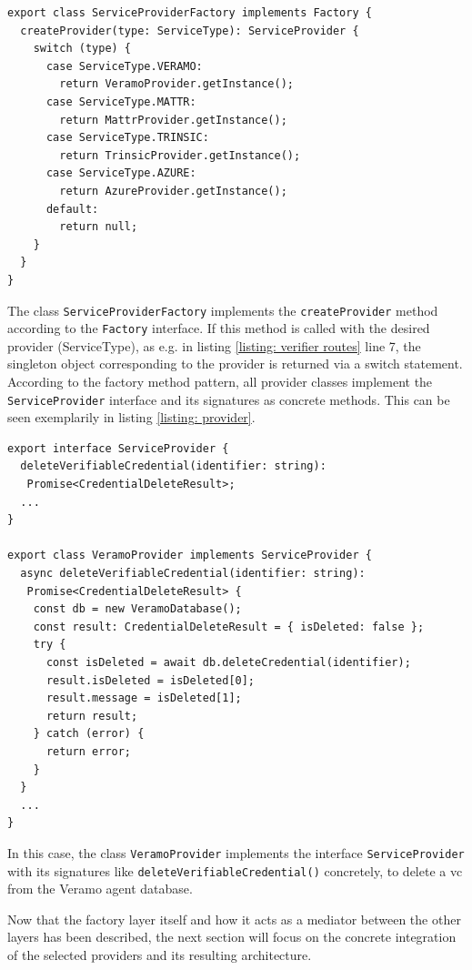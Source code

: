     \begin{lstlisting}[style=ES6, caption=Extract of service provider factory, label={listing: factory}]
export class ServiceProviderFactory implements Factory {
  createProvider(type: ServiceType): ServiceProvider {
    switch (type) {
      case ServiceType.VERAMO:
        return VeramoProvider.getInstance();
      case ServiceType.MATTR:
        return MattrProvider.getInstance();
      case ServiceType.TRINSIC:
        return TrinsicProvider.getInstance();
      case ServiceType.AZURE:
        return AzureProvider.getInstance();
      default:
        return null;
    }
  }
}
\end{lstlisting}

    The class \texttt{ServiceProviderFactory} implements the \texttt{createProvider} method according to the \texttt{Factory} interface. If this method is called with the desired provider (ServiceType), as e.g. in listing \ref{listing: verifier routes} line 7, the singleton object corresponding to the provider is returned via a switch statement. According to the factory method pattern, all provider classes implement the \texttt{ServiceProvider} interface and its signatures as concrete methods. This can be seen exemplarily in listing \ref{listing: provider}.
    \newline

\begin{lstlisting}[style=ES6, caption=Example of provider implementation, label={listing: provider}]
export interface ServiceProvider {
  deleteVerifiableCredential(identifier: string): 
   Promise<CredentialDeleteResult>;
  ...
}

export class VeramoProvider implements ServiceProvider {
  async deleteVerifiableCredential(identifier: string): 
   Promise<CredentialDeleteResult> {
    const db = new VeramoDatabase();
    const result: CredentialDeleteResult = { isDeleted: false };
    try {
      const isDeleted = await db.deleteCredential(identifier);
      result.isDeleted = isDeleted[0];
      result.message = isDeleted[1];
      return result;
    } catch (error) {
      return error;
    }
  }
  ...
}\end{lstlisting}

    In this case, the class \texttt{VeramoProvider} implements the interface \texttt{ServiceProvider} with its signatures like \texttt{deleteVerifiableCredential()} concretely, to delete a \ac{vc} from the Veramo agent database.
    
    Now that the factory layer itself and how it acts as a mediator between the other layers has been described, the next section will focus on the concrete integration of the selected providers and its resulting architecture.
    
